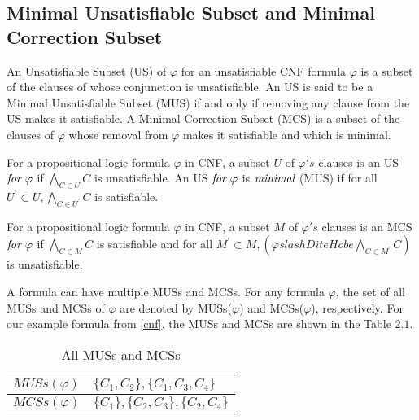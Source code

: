 \subsection{Minimal Unsatisfiable Subset and Minimal Correction Subset}
An Unsatisfiable Subset (US) of $\varphi$ for an unsatisfiable CNF formula $\varphi$ is a subset of the clauses of whose conjunction is unsatisfiable. An US is said to be a Minimal Unsatisfiable Subset (MUS) if and only if removing any clause from the US makes it satisfiable. A Minimal Correction Subset (MCS) is a subset of the clauses of $\varphi$ whose removal from $\varphi$ makes it satisfiable and which is minimal.
\begin{definition}[MUS]
	\label{def:mus}
	For a propositional logic formula $\varphi$ in CNF, a subset $U$ of $\varphi 's$ clauses is an US $\emph{for $\varphi$}$ if $\bigwedge \limits_{C\in U}C$ is unsatisfiable. An US $\emph{for $\varphi$}$ is $\emph{minimal}$ (MUS) if for all $U^{\prime}\subset U, \bigwedge \limits_{C\in U^{\prime}}C$ is satisfiable.
\end{definition}
\begin{definition}[MCS]
	\label{def:mcs}
	For a propositional logic formula $\varphi$ in CNF, a subset $M$ of $\varphi 's$ clauses is an MCS $\emph{for $\varphi$}$ if $\bigwedge \limits_{C \in M}C$ is satisfiable and for all $M^{\prime}\subset M, (\varphi slashDiteHobe \bigwedge \limits_{C\in M^{\prime}}C)$ is unsatisfiable.
\end{definition}
A formula can have multiple MUSs and MCSs. For any formula $\varphi$, the set of all MUSs and MCSs of $\varphi$ are denoted by MUSs($\varphi$) and MCSs($\varphi$), respectively.
For our example formula from \ref{cnf}, the MUSs and MCSs are shown in the Table $2.1$.
\begin{table}[]
	\centering
	\caption{All MUSs and MCSs}
	\label{mus-mcs}
	\begin{tabular}{|l|l|}
		\hline
		$MUSs(\varphi)$ & $\{C_{1},C_{2}\},\{C_{1},C_{3},C_{4}\}$ \\ \hline
		$MCSs(\varphi)$ & $\{C_{1}\},\{C_{2},C_{3}\},\{C_{2},C_{4}\}$ \\ \hline
	\end{tabular}
\end{table}
